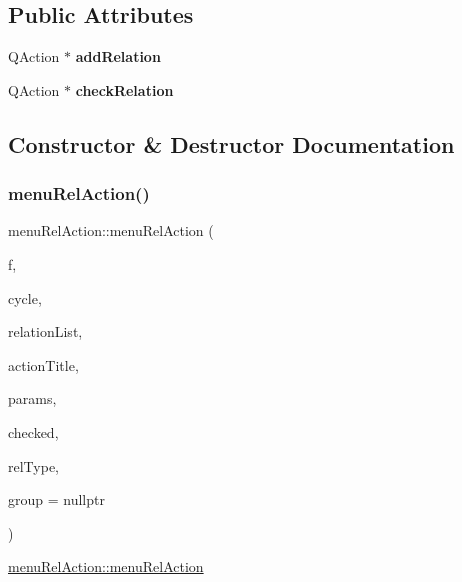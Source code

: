 \subsection*{Public Attributes}
\begin{DoxyCompactItemize}
\item 
\mbox{\label{classmenu_rel_action_ad9c9c61008821fcef78633ed38b42f8c}} 
Q\+Action $\ast$ {\bfseries add\+Relation}
\item 
\mbox{\label{classmenu_rel_action_afa273b825fbdc2d887cc6a3ecfc62265}} 
Q\+Action $\ast$ {\bfseries check\+Relation}
\end{DoxyCompactItemize}


\subsection{Constructor \& Destructor Documentation}
\mbox{\label{classmenu_rel_action_a2db14a6cd576e8cb645a0e1dcf584d4e}} 
\subsubsection{\texorpdfstring{menu\+Rel\+Action()}{menuRelAction()}}
{\footnotesize\ttfamily menu\+Rel\+Action\+::menu\+Rel\+Action (\begin{DoxyParamCaption}\item[{Moeb\+Inv\+::figure $\ast$}]{f,  }\item[{Moeb\+Inv\+::ex}]{cycle,  }\item[{Gi\+Na\+C\+::lst $\ast$}]{relation\+List,  }\item[{Q\+String}]{action\+Title,  }\item[{int}]{params,  }\item[{bool}]{checked,  }\item[{int}]{rel\+Type,  }\item[{\mbox{\hyperlink{classmenu_rel_action_group}{menu\+Rel\+Action\+Group}} $\ast$}]{group = {\ttfamily nullptr} }\end{DoxyParamCaption})}



\mbox{\hyperlink{classmenu_rel_action_a2db14a6cd576e8cb645a0e1dcf584d4e}{menu\+Rel\+Action\+::menu\+Rel\+Action}} 


